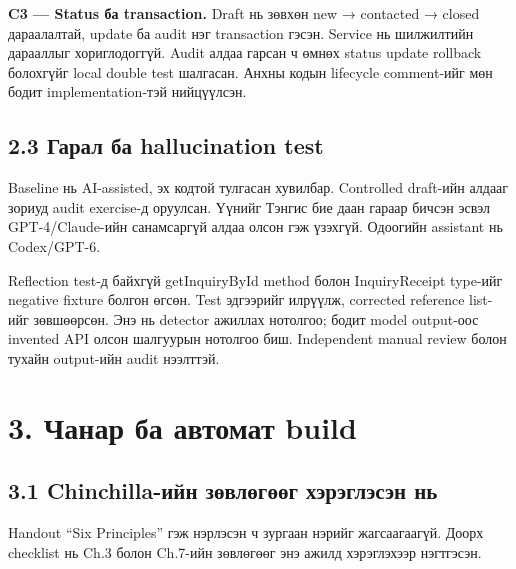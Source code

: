 \documentclass[
  mongolian,
]{article}
\begin{document}
\textbf{C3 --- Status ба transaction.} Draft нь зөвхөн new → contacted →
closed дараалалтай, update ба audit нэг transaction гэсэн. Service нь
шилжилтийн дарааллыг хориглодоггүй. Audit алдаа гарсан ч өмнөх status
update rollback болохгүйг local double test шалгасан. Анхны кодын
lifecycle comment-ийг мөн бодит implementation-тэй нийцүүлсэн.

\subsection{2.3 Гарал ба hallucination
test}\label{ux433ux430ux440ux430ux43b-ux431ux430-hallucination-test}

Baseline нь AI-assisted, эх кодтой тулгасан хувилбар. Controlled
draft-ийн алдааг зориуд audit exercise-д оруулсан. Үүнийг Тэнгис бие
даан гараар бичсэн эсвэл GPT-4/Claude-ийн санамсаргүй алдаа олсон гэж
үзэхгүй. Одоогийн assistant нь Codex/GPT-6.

Reflection test-д байхгүй getInquiryById method болон InquiryReceipt
type-ийг negative fixture болгон өгсөн. Test эдгээрийг илрүүлж,
corrected reference list-ийг зөвшөөрсөн. Энэ нь detector ажиллах
нотолгоо; бодит model output-оос invented API олсон шалгуурын нотолгоо
биш. Independent manual review болон тухайн output-ийн audit нээлттэй.

\clearpage

\section{3. Чанар ба автомат
build}\label{ux447ux430ux43dux430ux440-ux431ux430-ux430ux432ux442ux43eux43cux430ux442-build}

\subsection{3.1 Chinchilla-ийн зөвлөгөөг хэрэглэсэн
нь}\label{chinchilla-ux438ux439ux43d-ux437ux4e9ux432ux43bux4e9ux433ux4e9ux4e9ux433-ux445ux44dux440ux44dux433ux43bux44dux441ux44dux43d-ux43dux44c}

Handout ``Six Principles'' гэж нэрлэсэн ч зургаан нэрийг жагсаагаагүй.
Доорх checklist нь Ch.3 болон Ch.7-ийн зөвлөгөөг энэ ажилд хэрэглэхээр
нэгтгэсэн.
\end{document}
